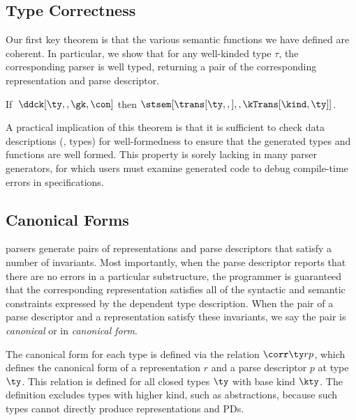 \subsection{Type Correctness}
Our first key theorem is that the various semantic
functions we have defined are coherent.  In particular, we show that
for any well-kinded \ddca{} type $\tau$, the corresponding parser is
well typed, returning a pair of the corresponding representation and
parse descriptor.


\begin{theorem}
\label{thm:s-type-correctness}
  If $\;\ddck[\ty,,\gk,\con]$ then
  $\stsem[{\trans[\ty,,]},,\kTrans[\kind,\ty]]$.
\end{theorem}

A practical implication of this theorem is that it is sufficient to
check data descriptions (\ie{}, \ddca{} types) for well-formedness to
ensure that the generated types and functions are well formed. This
property is sorely lacking in many parser generators, for which users
must examine generated code to debug compile-time errors in
specifications. 

\subsection{Canonical Forms}

\ddc{} parsers generate pairs of representations and parse descriptors
that satisfy a number of invariants.  Most importantly, 
when the parse descriptor reports that there are no errors in a
particular substructure, the programmer is guaranteed that the corresponding
representation satisfies all of the syntactic and semantic
constraints expressed by the dependent \ddc{} type description.  When
the pair of a parse descriptor and a representation satisfy these invariants, we say
the pair is {\em canonical} or in {\em canonical form}.

The canonical form for each \ddc{} type is defined via the relation $\corr \ty r p$, which
defines the canonical form of a representation $r$ and a parse
descriptor $p$ at type $\ty$.  This relation is defined for all closed types $\ty$ with base kind $\kty$.  The definition excludes
types with higher kind, such as abstractions, because such types
cannot directly produce representations and PDs.

